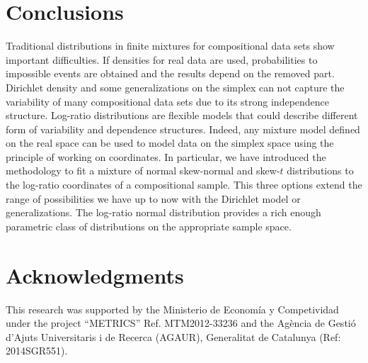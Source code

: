 \documentclass[12pt, a4paper]{article}
\newtheorem{prop}{Proposition}
\begin{document}
\section{Conclusions}
\label{conclusion_section}
Traditional distributions in finite mixtures for compositional data sets show important difficulties. If densities for real data are used, probabilities to impossible events are obtained and the results depend on the removed part. Dirichlet density and some generalizations on the simplex can not capture the variability of many compositional data sets due to its strong independence structure. Log-ratio distributions are flexible models that could describe different form of variability and dependence structures. Indeed, any mixture model defined on the real space can be used to model data on the simplex space using the principle of working on coordinates. In particular, we have introduced the methodology to fit a mixture of normal skew-normal and skew-$t$ distributions to the log-ratio coordinates of a compositional sample. This three options extend the range of possibilities we have up to now with the Dirichlet model or generalizations. The log-ratio normal distribution provides a rich enough parametric class of distributions on the appropriate sample space. 

\section*{Acknowledgments}
This research was supported by the Ministerio de Econom\'ia y Competividad under the project
``METRICS'' Ref. MTM2012-33236 and the Agència de Gestió d'Ajuts Universitaris i de Recerca (AGAUR), Generalitat de Catalunya (Ref: 2014SGR551).



{}


% 
\end{document}
